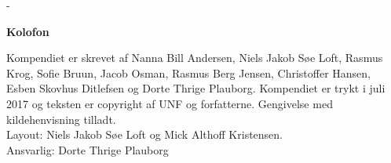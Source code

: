 \newpage


\begin{adjustwidth*}{\frontpagecorrection}{-\frontpagecorrection}
  \thispagestyle{empty}
  \strut
  \setlength{\parindent}{0pt}
  \addtolength{\parskip}{.6em}

  \vfill
    
  \begin{center}
    \bfseries Kolofon
  \end{center}
 
  \makeatletter
  \edef\fontandleading{\@memptsize.0/\the\baselineskip}
  \makeatother

  \small
   
  \textsl{\thesistitle}
    
  \smallskip
  
  Kompendiet er skrevet af Nanna Bill Andersen, Niels Jakob Søe Loft, Rasmus Krog, Sofie Bruun, Jacob Osman, Rasmus Berg Jensen, Christoffer Hansen, Esben Skovhus Ditlefsen og Dorte Thrige Plauborg. Kompendiet er trykt i juli 2017 og teksten
  er copyright
   af UNF og forfatterne. Gengivelse med kildehenvisning tilladt. \\
  Layout: Niels Jakob Søe Loft og Mick Althoff Kristensen.\\
  Ansvarlig: Dorte Thrige Plauborg
\end{adjustwidth*}




